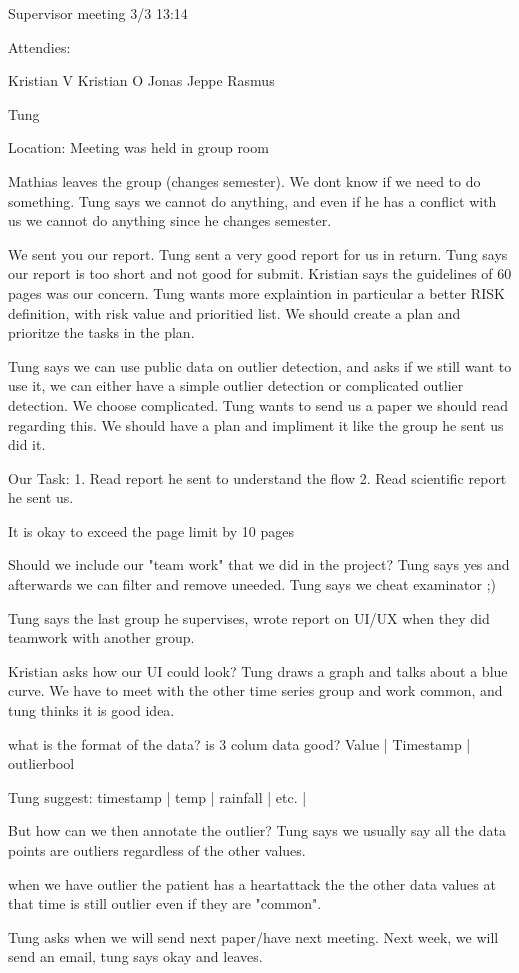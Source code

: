 Supervisor meeting 3/3 13:14

Attendies:

Kristian V
Kristian O
Jonas
Jeppe
Rasmus

Tung

Location: Meeting was held in group room

Mathias leaves the group (changes semester). We dont know if we need to do something. Tung says we cannot do anything, and even if he has a conflict with us we cannot do anything since he changes semester.

We sent you our report. Tung sent a very good report for us in return. Tung says our report is too short and not good for submit. Kristian says the guidelines of 60 pages was our concern.  Tung wants more explaintion in particular a better RISK definition, with risk value and prioritied list. We should create a plan and prioritze the tasks in the plan. 

Tung says we can use public data on outlier detection, and asks if we still want to use it, we can either have a simple outlier detection or complicated outlier detection. We choose complicated. Tung wants to send us a paper we should read regarding this. We should have a plan and impliment it like the group he sent us did it.

Our Task:
1. Read report he sent to understand the flow
2. Read scientific report he sent us.

It is okay to exceed the page limit by 10 pages

Should we include our "team work" that we did in the project? Tung says yes and afterwards we can filter and remove uneeded. Tung says we cheat examinator ;)

Tung says the last group he supervises, wrote report on UI/UX when they did teamwork with another group. 

Kristian asks how our UI could look? Tung draws a graph and talks about a blue curve. We have to meet with the other time series group and work common, and tung thinks it is good idea.

what is the format of the data? is 3 colum data good? 
Value | Timestamp | outlierbool

Tung suggest:
timestamp | temp | rainfall | etc. | 

But how can we then annotate the outlier?
Tung says we usually say all the data points are outliers regardless of the other values. 

when we have outlier the patient has a heartattack the the other data values at that time is still outlier even if they are "common".

Tung asks when we will send next paper/have next meeting. Next week, we will send an email, tung says okay and leaves.